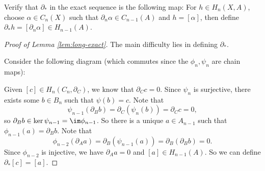 \begin{exercise}
  Verify that $\partial_*$ in the
  exact sequence is the following map:
  For $h \in H_n(X, A)$, choose $\alpha \in C_n(X)$
  such that $\partial_n \alpha \in C_{n - 1}(A)$
  and $h = [\alpha]$, then define
  $\partial_* h = [\partial_n \alpha] \in H_{n - 1}(A)$.
\end{exercise}

\begin{proof}[Proof of Lemma \ref{lem:long-exact}]
  The main difficulty lies in defining $\partial_*$.

  Consider the following diagram (which commutes since
  the $\phi_n, \psi_n$ are chain maps):
  \begin{center}
  \end{center}
  Given $[c] \in H_n(C_n, \partial_C)$, we know that
  $\partial_C c = 0$. Since $\psi_n$ is surjective,
  there exists some $b \in B_n$ such that
  $\psi(b) = c$. Note that
  \[
    \psi_{n - 1}(\partial_B b)
    = \partial_C(\psi_n(b))
    = \partial_C c = 0,
  \]
  so $\partial_B b \in \ker \psi_{n - 1} = \im \phi_{n - 1}$.
  So there is a unique $a \in A_{n - 1}$ such that
  $\phi_{n - 1}(a) = \partial_B b$. Note that
  \[
    \phi_{n - 2}(\partial_A a)
    = \partial_B (\psi_{n - 1} (a))
    = \partial_B (\partial_B b) = 0.
  \]
  Since $\phi_{n - 2}$ is injective, we have
  $\partial_{A} a = 0$ and $[a] \in H_{n - 1}(A)$.
  So we can define $\partial_*[c] = [a]$.


\end{proof}
